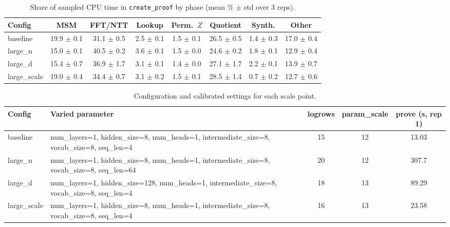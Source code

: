 \begin{table}[t]
  \centering
  \caption{Share of sampled CPU time in \texttt{create\_proof} by phase (mean \% $\pm$ std over 3 reps).}
  \label{tab:create-proof-phase-breakdown}
  \begin{tabular}{lccccccc}
    \toprule
    Config & MSM & FFT/NTT & Lookup & Perm.\ $Z$ & Quotient & Synth. & Other \\
    \midrule
    baseline & 19.9 $\pm$ 0.1 & 31.1 $\pm$ 0.5 & 2.5 $\pm$ 0.1 & 1.5 $\pm$ 0.1 & 26.5 $\pm$ 0.5 & 1.4 $\pm$ 0.3 & 17.0 $\pm$ 0.4 \\
    large\_n & 15.0 $\pm$ 0.1 & 40.5 $\pm$ 0.2 & 3.6 $\pm$ 0.1 & 1.5 $\pm$ 0.0 & 24.6 $\pm$ 0.2 & 1.8 $\pm$ 0.1 & 12.9 $\pm$ 0.4 \\
    large\_d & 15.4 $\pm$ 0.7 & 36.9 $\pm$ 1.7 & 3.1 $\pm$ 0.1 & 1.4 $\pm$ 0.0 & 27.1 $\pm$ 1.7 & 2.2 $\pm$ 0.1 & 13.9 $\pm$ 0.7 \\
    large\_scale & 19.0 $\pm$ 0.4 & 34.4 $\pm$ 0.7 & 3.1 $\pm$ 0.2 & 1.5 $\pm$ 0.1 & 28.5 $\pm$ 1.4 & 0.7 $\pm$ 0.2 & 12.7 $\pm$ 0.6 \\
    \bottomrule
  \end{tabular}
\end{table}

\begin{table}[t]
  \centering
  \caption{Configuration and calibrated settings for each scale point.}
  \label{tab:create-proof-scale-configs}
  \begin{tabular}{lp{4.2cm}ccc}
    \toprule
    Config & Varied parameter & logrows & param\_scale & prove (s, rep 1) \\
    \midrule
    baseline & num\_layers=1, hidden\_size=8, num\_heads=1, intermediate\_size=8, vocab\_size=8, seq\_len=4 & 15 & 12 & 13.03 \\
    large\_n & num\_layers=1, hidden\_size=8, num\_heads=1, intermediate\_size=8, vocab\_size=8, seq\_len=64 & 20 & 12 & 307.7 \\
    large\_d & num\_layers=1, hidden\_size=128, num\_heads=1, intermediate\_size=8, vocab\_size=8, seq\_len=4 & 18 & 13 & 89.29 \\
    large\_scale & num\_layers=1, hidden\_size=8, num\_heads=1, intermediate\_size=8, vocab\_size=8, seq\_len=4 & 16 & 13 & 23.58 \\
    \bottomrule
  \end{tabular}
\end{table}
